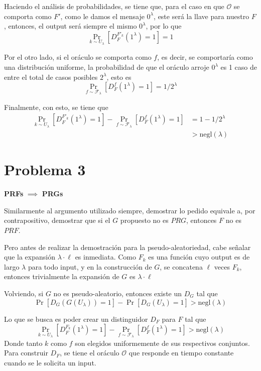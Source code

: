 \documentclass[twoside]{tareas}
\begin{document}
\begin{enumerate}
    Haciendo el análisis de probabilidades, se tiene que, para el caso en que $\mathcal{O}$ se comporta como $F'$, como le damos el mensaje $0^{\lambda}$, este será la llave para nuestro $F$, entonces, el output será siempre el mismo $0^{\lambda}$, por lo que
    $$\Pr_{k \sim U_\lambda}[D_F^{F'_k}(1^{\lambda}) = 1] = 1$$

    Por el otro lado, si el oráculo se comporta como $f$, es decir, se comportaría como una distribución uniforme, la probabilidad de que el oráculo arroje $0^{\lambda}$ es 1 caso de entre el total de casos posibles $2^{\lambda}$, esto es
    $$\Pr_{f \sim \mathcal{F}_\lambda}[D_F^{f}(1^\lambda) = 1] = 1/2^{\lambda}$$

    Finalmente, con esto, se tiene que
    \begin{align*}
        \Pr_{k \sim U_\lambda}[D_F^{F'_k}(1^{\lambda}) = 1] - \Pr_{f \sim \mathcal{F}_\lambda}[D_F^{f}(1^\lambda) = 1] &= 1 - 1/2^{\lambda}\\
        &> \text{negl}(\lambda)
    \end{align*}



\end{enumerate}

\section*{Problema 3}

\textbf{PRFs} {\boldmath$\implies$} \textbf{PRGs}

Similarmente al argumento utilizado siempre, demostrar lo pedido equivale a, por contrapositivo, demostrar que si el $G$ propuesto no es $PRG$, entonces $F$ no es $PRF$.

Pero antes de realizar la demostración para la pseudo-aleatoriedad, cabe señalar que la expansión $\lambda \cdot \ell$ es inmediata. Como $F_k$ es una función cuyo output es de largo $\lambda$ para todo input, y en la construcción de $G$, se concatena $\ell$ veces $F_k$, entonces trivialmente la expansión de $G$ es $\lambda \cdot \ell$

Volviendo, si $G$ no es pseudo-aleatorio, entonces existe un $D_G$ tal que
$$\Pr[D_G(G(U_\lambda)) = 1] - \Pr[D_G(U_\lambda) = 1] > \text{negl}(\lambda)$$

Lo que se busca es poder crear un distinguidor $D_F$ para $F$ tal que
$$\Pr_{k \sim U_\lambda}[D_F^{F_k}(1^\lambda) = 1] - \Pr_{f \sim \mathcal{F}_\lambda}[D_F^{f}(1^\lambda) = 1] > \text{negl}(\lambda)$$
Donde tanto $k$ como $f$ son elegidos uniformemente de sus respectivos conjuntos. Para construir $D_F$, se tiene el oráculo $\mathcal{O}$ que responde en tiempo constante cuando se le solicita un input.
\end{document}
